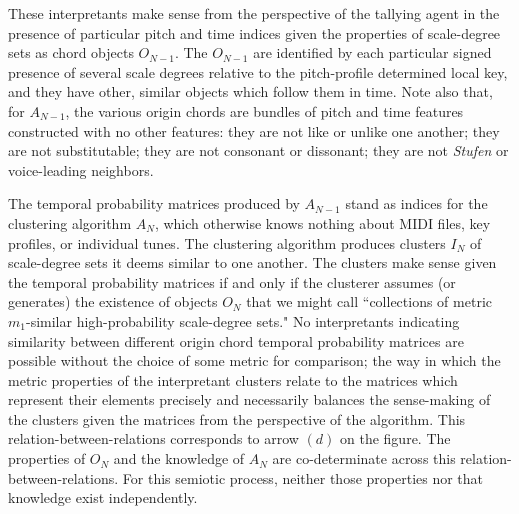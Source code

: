 These interpretants make sense from the perspective of the tallying agent in the presence of particular pitch and time indices given the properties of scale-degree sets as chord objects $O_{N-1}$.  The $O_{N-1}$ are identified by each particular signed presence of several scale degrees relative to the pitch-profile determined local key, and they have other, similar objects which follow them in time.  Note also that, for $A_{N-1}$, the various origin chords are bundles of pitch and time features constructed with no other features: they are not like or unlike one another; they are not substitutable; they are not consonant or dissonant; they are not \emph{Stufen} or voice-leading neighbors.

The temporal probability matrices produced by $A_{N-1}$ stand as indices for the clustering algorithm $A_{N}$, which otherwise knows nothing about MIDI files, key profiles, or individual tunes.  The clustering algorithm produces clusters $I_{N}$ of scale-degree sets it deems similar to one another.  The clusters make sense given the temporal probability matrices if and only if the clusterer assumes (or generates) the existence of objects $O_N$ that we might call ``collections of metric $m_1$-similar high-probability scale-degree sets."  No interpretants indicating similarity between different origin chord temporal probability matrices are possible without the choice of some metric for comparison; the way in which the metric properties of the interpretant clusters relate to the matrices which represent their elements precisely and necessarily balances the sense-making of the clusters given the matrices from the perspective of the algorithm.  This relation-between-relations corresponds to arrow $(d)$ on the figure.  The properties of $O_N$ and the knowledge of $A_N$ are co-determinate across this relation-between-relations.  For this semiotic process, neither those properties nor that knowledge exist independently.

